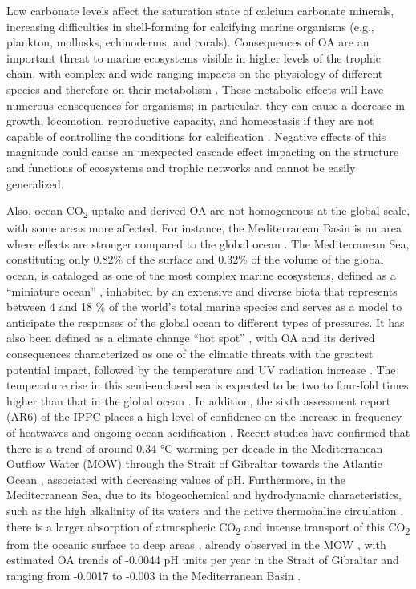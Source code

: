 Low carbonate levels affect the saturation state of calcium carbonate minerals,
increasing difficulties in shell-forming for calcifying marine organisms (e.g.,
plankton, mollusks, echinoderms, and corals). Consequences of OA are an
important threat to marine ecosystems visible in higher levels of the trophic
chain, with complex and wide-ranging impacts on the physiology of different
species and therefore on their
metabolism \cite{kroeker2013impacts,nilsson2012near}. These metabolic effects
will have numerous consequences for organisms; in particular, they can
cause a decrease in growth, locomotion, reproductive capacity, and homeostasis
if they are not capable of controlling the conditions for
calcification \cite{hendriks2015biological}. Negative effects of this magnitude
could cause an unexpected cascade effect impacting on the structure and
functions of ecosystems and trophic networks \cite{zunino2021impact} and cannot
be easily generalized.

Also, ocean CO\textsubscript{2} uptake and derived OA are not homogeneous
at the global scale, with some areas more affected. For instance, the
Mediterranean Basin is an area where effects are stronger compared to the
global ocean \cite{Giorgi2006}. The Mediterranean Sea, constituting only
0.82\% of the surface and 0.32\% of the volume of the global ocean, is
cataloged as one of the most complex marine ecosystems, defined as a “miniature
ocean” \cite{bethoux1999mediterranean}, inhabited by an extensive and diverse
biota that represents between 4 and 18 \% of the world's total marine species
\cite{Bianchi2000} and serves as a model \cite{bethoux1999mediterranean} to
anticipate the responses of the global ocean to different types of pressures.
It has also been defined as a climate change ``hot spot'' \cite{Giorgi2006},
with OA and its derived consequences characterized as one of the climatic
threats with the greatest potential impact, followed by the temperature and UV
radiation increase \cite{micheli2013}. The temperature rise in this
semi-enclosed sea is expected to be two to four-fold times higher than that in
the global ocean \cite{vargas2008w, vargas2010}. In addition, the sixth
assessment report (AR6) of the IPPC places a high level of confidence on the
increase in frequency of heatwaves and ongoing ocean
acidification \cite{Masson-Delmotte2021}. Recent studies have confirmed that
there is a trend of around 0.34 °C warming per decade in the Mediterranean
Outflow Water (MOW) through the Strait of Gibraltar towards the Atlantic Ocean
\cite{Garcia-Lafuente2021}, associated with decreasing values of pH.
Furthermore, in the Mediterranean Sea, due to its biogeochemical and
hydrodynamic characteristics, such as the high alkalinity of its waters and the
active thermohaline circulation \cite{Alvarez2014}, there is a larger
absorption of atmospheric CO\textsubscript{2} and intense transport of this
CO\textsubscript{2} from the oceanic surface to deep
areas \cite{Hassoun2015,Palmieri2015}, already observed in the MOW
\cite{Flecha2015,Flecha2019}, with estimated OA trends of -0.0044 pH units per
year in the Strait of Gibraltar \cite{Flecha2015} and ranging from -0.0017 to
-0.003 in the Mediterranean Basin \cite{Kapsenberg2017,yao2016}.

